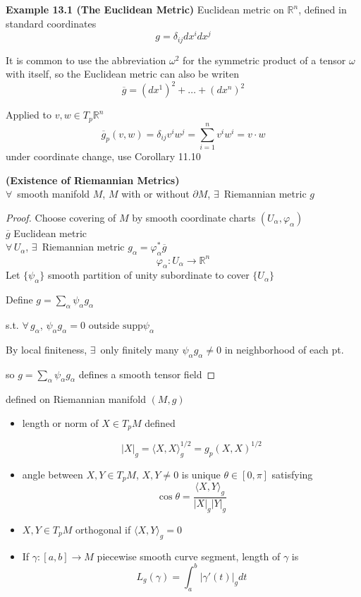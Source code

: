 \textbf{Example 13.1 (The Euclidean Metric)}  Euclidean metric on $\mathbb{R}^n$, defined in standard coordinates
\[
g = \delta_{ij} dx^i dx^j
\]

It is common to use the abbreviation $\omega^2$ for the symmetric product of a tensor $\omega$ with itself, so the Euclidean metric can also be writen 
\[
\overline{g} = (dx^1)^2 + \dots + (dx^n)^2 
\]

Applied to $v,w \in T_p\mathbb{R}^n$ 
\[
\overline{g}_p(v,w) = \delta_{ij} v^i w^j = \sum_{i=1}^n v^i w^i = v\cdot w
\]
under coordinate change, use Corollary 11.10

\begin{proposition}[13.3] \textbf{(Existence of Riemannian Metrics)} \\
                          $\forall \, $ smooth manifold $M$, $M$ with or without $\partial M$, $\exists \, $ Riemannian metric $g$
\end{proposition}

\begin{proof}
Choose covering of $M$ by smooth coordinate charts $(U_{\alpha}, \varphi_{\alpha})$ \\
$\overline{g}$ Euclidean metric \\
$\forall \, U_{\alpha}$, $\exists \, $ Riemannian metric $g_{\alpha} = \varphi_{\alpha}^* \overline{g}$ 
\[
\varphi_{\alpha} : U_{\alpha} \to \mathbb{R}^n
\]
Let $\lbrace \psi_{\alpha} \rbrace$ smooth partition of unity subordinate to cover $\lbrace U_{\alpha} \rbrace$

Define $g= \sum_{\alpha} \psi_{\alpha} g_{\alpha}$

s.t. $\forall \, g_{\alpha}$, $\psi_{\alpha} g_{\alpha} = 0$ outside $\text{supp}{\psi_{\alpha}}$

By local finiteness, $\exists \, $ only finitely many $\psi_{\alpha} g_{\alpha} \neq 0$ in neighborhood of each pt. 

so $g= \sum_{\alpha} \psi_{\alpha} g_{\alpha}$ defines a smooth tensor field


\end{proof}


defined on Riemannian manifold $(M,g)$

\begin{itemize}
  \item length or norm of $X \in T_pM$ defined

\[
|X|_g = \langle X, X \rangle_g^{1/2} = g_p(X,X)^{1/2}
\]
\item angle between $X,Y \in T_pM$, $X,Y \neq 0$ is unique $\theta \in [0,\pi]$ satisfying 
\[
\cos{\theta} = \frac{ \langle X,Y \rangle_g }{ |X|_g |Y|_g}
\]
\item $X,Y \in T_pM$ orthogonal if $\langle X,Y\rangle_g = 0$
\item If $\gamma:[a,b] \to M$ piecewise smooth curve segment, length of $\gamma$ is 
\[
L_g(\gamma) = \int_a^b |\gamma'(t)|_g dt
\]
\end{itemize}

